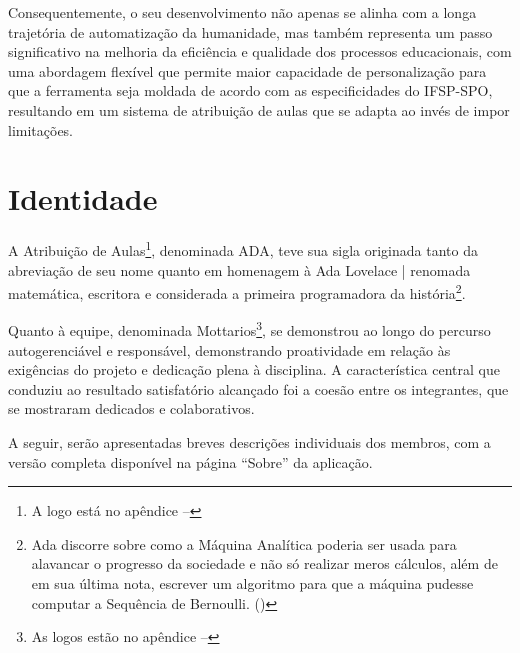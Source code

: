 \documentclass[12pt]{article}
\begin{document}
\par Consequentemente, o seu desenvolvimento não apenas se alinha com a longa trajetória de automatização da humanidade, mas também representa um passo significativo na melhoria da eficiência e qualidade dos processos educacionais, com uma abordagem flexível que permite maior capacidade de personalização para que a ferramenta seja moldada de acordo com as especificidades do IFSP-SPO, resultando em um sistema de atribuição de aulas que se adapta ao invés de impor limitações.



\section{Identidade}
\par A Atribuição de Aulas\footnote{A logo está no apêndice --}, denominada ADA, teve sua sigla originada tanto da abreviação de seu nome quanto em homenagem à Ada Lovelace | renomada matemática, escritora e considerada a primeira programadora da história\footnote{Ada discorre sobre como a Máquina Analítica poderia ser usada para alavancar o progresso da sociedade e não só realizar meros cálculos, além de em sua última nota, escrever um algoritmo para que a máquina pudesse computar a Sequência de Bernoulli. ()}.
\par Quanto à equipe, denominada Mottarios\footnote{As logos estão no apêndice --}, se demonstrou ao longo do percurso autogerenciável e responsável, demonstrando proatividade em relação às exigências do projeto e dedicação plena à disciplina. A característica central que conduziu ao resultado satisfatório alcançado foi a coesão entre os integrantes, que se mostraram dedicados e colaborativos. 
\par A seguir, serão apresentadas breves descrições individuais dos membros, com a versão completa disponível na página “Sobre” da aplicação.
\end{document}
